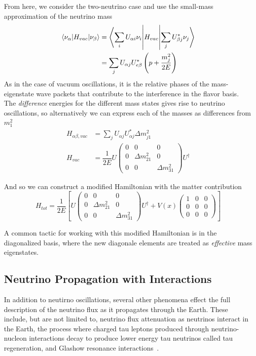 \documentclass[main.tex]{subfiles}
\begin{document}
From here, we consider the two-neutrino case and use the small-mass approximation of the neutrino mass
\begin{align} 
    \left< \nu_{\alpha} | H_{vac} | \nu_{\beta}  \right> &= \left<  \sum_{i} U_{\alpha i} \nu_{i} \middle| H_{vac} \middle| \sum_{j} U_{\beta j}^{*}\nu_{j} \right>  \\
    &=  \sum\limits_{j} U_{\alpha j} U^{*}_{e\beta}\left( p + \dfrac{m_{j}^{2}}{2E} \right)
\end{align}
As in the case of vacuum oscillations, it is the relative phases of the mass-eigenstate wave packets that contribute to the interference in the flavor basis. 
The \textit{difference} energies for the different mass states gives rise to neutrino oscillations, so alternatively we can express each of the masses as differences from $m_{1}^{2}$ 
\begin{align}
    H_{\alpha \beta, vac } &= \sum\limits_{j} U_{\alpha j} U^{*}_{\alpha j} \Delta m^{2}_{j1}\\
    H_{vac }&= \dfrac{1}{2E} U\left(\begin{array}{ccc} 0 & 0 & 0 \\ 0 & \Delta m_{21}^{2} & 0 \\ 0 & 0 & \Delta m_{31}^{2} \end{array}\right)U^{\dag}
\end{align}

And so we can construct a modified Hamiltonian with the matter contribution 
\begin{equation}
    H_{tot }= \dfrac{1}{2E} \left[ U\left(\begin{array}{ccc} 0 & 0 & 0 \\ 0 & \Delta m_{21}^{2} & 0 \\ 0 & 0 & \Delta m_{31}^{2} \end{array}\right)U^{\dag} + V(x)\left(\begin{array}{ccc} 1&0&0\\0&0&0 \\0&0&0 \end{array}\right)  \right]
\end{equation}

A common tactic for working with this modified Hamiltonian is in the diagonalized basis, where the new diagonale elements are treated as \textit{effective} mass eigenstates. 


\subsection{Neutrino Propagation with Interactions}
In addition to neutirno oscillations, several other phenomena effect the full description of the neutrino flux as it propagates through the Earth. 
These include, but are not limited to, neutrino flux attenuation as neutrinos interact in the Earth, the process where charged tau leptons produced through neutrino-nucleon interactions decay to produce lower energy tau neutrinos called tau regeneration, and Glashow resonance interactions~\cite{PhysRev.118.316}.  
\end{document}
